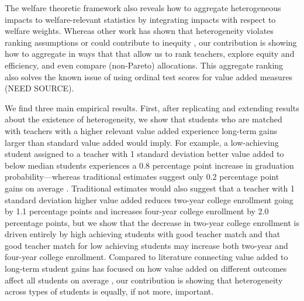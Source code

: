 \documentclass{article}
\theoremstyle{definition}
\theoremstyle{definition}
\theoremstyle{definition}
\theoremstyle{definition}
\begin{document}
    The welfare theoretic framework also reveals how to aggregate heterogeneous impacts to welfare-relevant statistics by integrating impacts with respect to welfare weights. Whereas other work has shown that heterogeneity violates ranking assumptions \citep{condie2014teacher} or could contribute to inequity \citep{Delgado2020,bates2022teacher}, our contribution is showing how to aggregate in ways that that allow us to rank teachers, explore equity and efficiency, and even compare (non-Pareto) allocations. This aggregate ranking also solves the known issue of using ordinal test scores for value added measures (NEED SOURCE). 
    
    We find three main empirical results. First, after replicating and extending results about the existence of heterogeneity, we show that students who are matched with teachers with a higher relevant value added experience long-term gains larger than standard value added would imply. For example, a low-achieving student assigned to a teacher with 1 standard deviation better value added to below median students experiences a 0.8 percentage point increase in graduation probability---whereas traditional estimates suggest only 0.2 percentage point gains on average \citep[][]{pope2017multidimensional}. Traditional estimates would also suggest that a teacher with 1 standard deviation higher value added reduces two-year college enrollment going by 1.1 percentage points and increases four-year college enrollment by 2.0 percentage points, but we show that the decrease in two-year college enrollment is driven entirely by high achieving students with good teacher match and that good teacher match for low achieving students may increase both two-year and four-year college enrollment. Compared to literature connecting value added to long-term student gains has focused on how value added on different outcomes affect all students on average \citep{chetty2014measuring2,pope2017multidimensional,gilraine2021making}, our contribution is showing that heterogeneity across types of students is equally, if not more, important.
    
\end{document}
